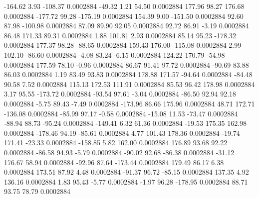      -164.62        3.93     -108.37     0.0002884
      -49.32        1.21       54.50     0.0002884
      177.96       98.27      176.68     0.0002884
     -177.72       99.28     -175.19     0.0002884
      154.39        9.00     -151.50     0.0002884
       92.60       87.98     -100.98     0.0002884
       87.09       89.90       92.05     0.0002884
       92.72       86.91       -3.19     0.0002884
       86.48      171.33       89.31     0.0002884
        1.88      101.81        2.93     0.0002884
       85.14       95.23     -178.32     0.0002884
      177.37       98.28      -88.65     0.0002884
      159.43      176.00     -115.08     0.0002884
        2.99      102.10      -86.60     0.0002884
       -4.08       83.24       -6.15     0.0002884
      124.22      170.79      -54.98     0.0002884
      177.59       78.10       -0.96     0.0002884
       86.67       91.41       97.72     0.0002884
      -90.69       83.88       86.03     0.0002884
        1.19       83.49       93.83     0.0002884
      178.88      171.57      -94.64     0.0002884
      -84.48       90.58        7.52     0.0002884
      115.13      172.53      111.91     0.0002884
       85.53       96.42      178.98     0.0002884
        3.17       95.55     -173.72     0.0002884
      -93.54       97.61       -3.04     0.0002884
      -86.50       92.94       92.18     0.0002884
       -5.75       89.43       -7.49     0.0002884
     -173.96       86.66      175.96     0.0002884
       48.71      172.71     -136.08     0.0002884
      -85.99       97.17       -0.58     0.0002884
      -15.08       11.53      -73.47     0.0002884
      -88.94       88.73      -95.24     0.0002884
     -149.41        6.32       61.36     0.0002884
      -19.53      175.35      162.98     0.0002884
     -178.46       94.19      -85.61     0.0002884
        4.77      101.43      178.36     0.0002884
      -19.74      171.41      -23.33     0.0002884
     -158.85        5.82      162.00     0.0002884
      176.89       93.68       92.22     0.0002884
      -86.58       94.93       -5.79     0.0002884
      -90.02       92.68      -86.38     0.0002884
      -31.12      176.67       58.94     0.0002884
      -92.96       87.64     -173.44     0.0002884
      179.49       86.17        6.38     0.0002884
      173.51       87.92        4.48     0.0002884
      -91.37       96.72      -85.15     0.0002884
      137.35        4.92      136.16     0.0002884
        1.83       95.43       -5.77     0.0002884
       -1.97       96.28     -178.95     0.0002884
       88.71       93.75       78.79     0.0002884
